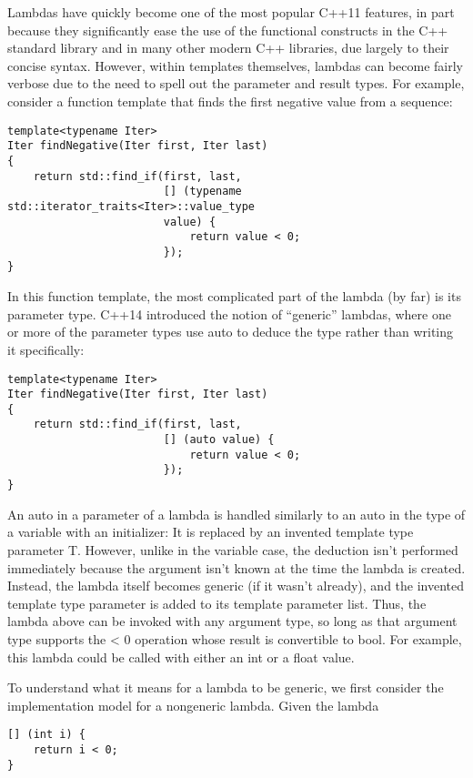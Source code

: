 
Lambdas have quickly become one of the most popular C++11 features, in part because they significantly ease the use of the functional constructs in the C++ standard library and in many other modern
C++ libraries, due largely to their concise syntax. However, within templates themselves, lambdas
can become fairly verbose due to the need to spell out the parameter and result types. For example, consider a function template that finds the first negative value from a sequence:

\begin{lstlisting}[style=styleCXX]
template<typename Iter>
Iter findNegative(Iter first, Iter last)
{
	return std::find_if(first, last,
						[] (typename std::iterator_traits<Iter>::value_type
						value) {
							return value < 0;
						});
}
\end{lstlisting}

In this function template, the most complicated part of the lambda (by far) is its parameter type. C++14 introduced the notion of “generic” lambdas, where one or more of the parameter types use auto to deduce the type rather than writing it specifically:

\begin{lstlisting}[style=styleCXX]
template<typename Iter>
Iter findNegative(Iter first, Iter last)
{
	return std::find_if(first, last,
						[] (auto value) {
							return value < 0;
						});
}
\end{lstlisting}

An auto in a parameter of a lambda is handled similarly to an auto in the type of a variable with an initializer: It is replaced by an invented template type parameter T. However, unlike in the variable case, the deduction isn’t performed immediately because the argument isn’t known at the time the lambda is created. Instead, the lambda itself becomes generic (if it wasn’t already), and the invented template type parameter is added to its template parameter list. Thus, the lambda above can be invoked with any argument type, so long as that argument type supports the < 0 operation whose result is convertible to bool. For example, this lambda could be called with either an int or a float value.

To understand what it means for a lambda to be generic, we first consider the implementation model for a nongeneric lambda. Given the lambda

\begin{lstlisting}[style=styleCXX]
[] (int i) {
	return i < 0;
}
\end{lstlisting}

